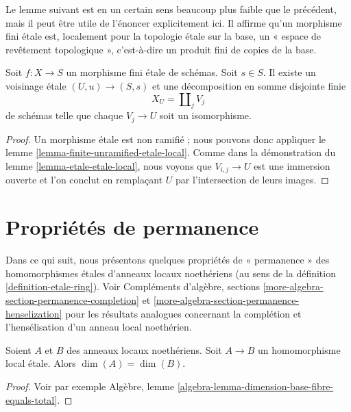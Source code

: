\noindent
Le lemme suivant est en un certain sens beaucoup plus faible que le précédent,
mais il peut être utile de l'énoncer explicitement ici. Il affirme qu'un morphisme fini
\'etale est, localement pour la topologie \'etale sur la base, un
« espace de revêtement topologique », c'est-à-dire un produit fini de copies de la base.

\begin{lemma}
\label{lemma-finite-etale-etale-local}
Soit $f : X \to S$ un morphisme fini \'etale de schémas.
Soit $s \in S$. Il existe un voisinage \'etale $(U, u) \to (S, s)$
et une décomposition en somme disjointe finie
$$
X_U = \coprod\nolimits_j V_j
$$
de schémas telle que chaque $V_j \to U$ soit un isomorphisme.
\end{lemma}

\begin{proof}
Un morphisme \'etale est non ramifié ; nous pouvons donc appliquer le
lemme \ref{lemma-finite-unramified-etale-local}.
Comme dans la démonstration du
lemme \ref{lemma-etale-etale-local},
nous voyons que $V_{i, j} \to U$ est une immersion ouverte et l'on conclut
en remplaçant $U$ par l'intersection de leurs images.
\end{proof}




\section{Propriétés de permanence}
\label{section-properties-permanence}

\noindent
Dans ce qui suit, nous présentons quelques propriétés de « permanence »
des homomorphismes \'etales d'anneaux locaux noethériens
(au sens de la définition \ref{definition-etale-ring}). Voir
Compléments d'algèbre, sections \ref{more-algebra-section-permanence-completion} et
\ref{more-algebra-section-permanence-henselization}
pour les résultats analogues concernant la complétion et
l'hensélisation d'un anneau local noethérien.

\begin{lemma}
\label{lemma-etale-dimension}
Soient $A$ et $B$ des anneaux locaux noethériens.
Soit $A \to B$ un homomorphisme local \'etale.
Alors $\dim(A) = \dim(B)$.
\end{lemma}

\begin{proof}
Voir par exemple
Algèbre, lemme \ref{algebra-lemma-dimension-base-fibre-equals-total}.
\end{proof}

